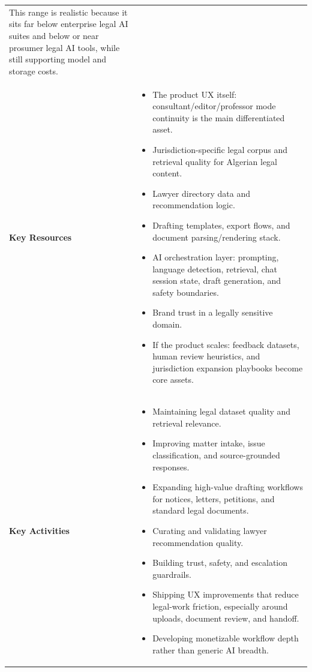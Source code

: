 \documentclass[11pt]{article}
\begin{document}
\begin{longtable}{p{} p{}}
This range is realistic because it sits far below enterprise legal AI suites and below or near prosumer legal AI tools, while still supporting model and storage costs. \\

\textbf{Key Resources} &
\begin{itemize}
  \item The product UX itself: consultant/editor/professor mode continuity is the main differentiated asset.
  \item Jurisdiction-specific legal corpus and retrieval quality for Algerian legal content.
  \item Lawyer directory data and recommendation logic.
  \item Drafting templates, export flows, and document parsing/rendering stack.
  \item AI orchestration layer: prompting, language detection, retrieval, chat session state, draft generation, and safety boundaries.
  \item Brand trust in a legally sensitive domain.
  \item If the product scales: feedback datasets, human review heuristics, and jurisdiction expansion playbooks become core assets.
\end{itemize} \\

\textbf{Key Activities} &
\begin{itemize}
  \item Maintaining legal dataset quality and retrieval relevance.
  \item Improving matter intake, issue classification, and source-grounded responses.
  \item Expanding high-value drafting workflows for notices, letters, petitions, and standard legal documents.
  \item Curating and validating lawyer recommendation quality.
  \item Building trust, safety, and escalation guardrails.
  \item Shipping UX improvements that reduce legal-work friction, especially around uploads, document review, and handoff.
  \item Developing monetizable workflow depth rather than generic AI breadth.
\end{itemize} \\


\end{longtable}
\end{document}

